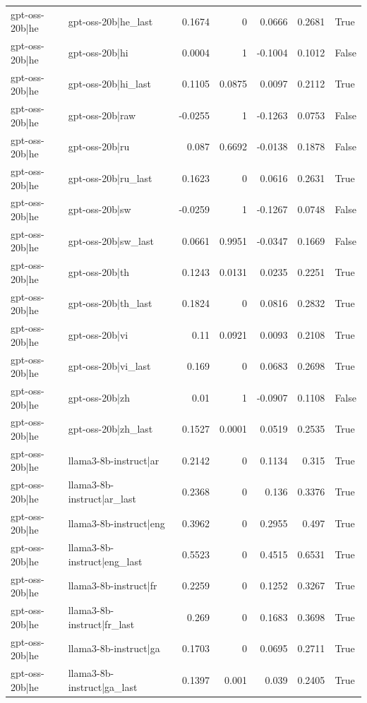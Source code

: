 \begin{table}
\begin{tabular}{l l r r r r l}
gpt-oss-20b|he & gpt-oss-20b|he_last & 0.1674 & 0 & 0.0666 & 0.2681 & True \\
gpt-oss-20b|he & gpt-oss-20b|hi & 0.0004 & 1 & -0.1004 & 0.1012 & False \\
gpt-oss-20b|he & gpt-oss-20b|hi_last & 0.1105 & 0.0875 & 0.0097 & 0.2112 & True \\
gpt-oss-20b|he & gpt-oss-20b|raw & -0.0255 & 1 & -0.1263 & 0.0753 & False \\
gpt-oss-20b|he & gpt-oss-20b|ru & 0.087 & 0.6692 & -0.0138 & 0.1878 & False \\
gpt-oss-20b|he & gpt-oss-20b|ru_last & 0.1623 & 0 & 0.0616 & 0.2631 & True \\
gpt-oss-20b|he & gpt-oss-20b|sw & -0.0259 & 1 & -0.1267 & 0.0748 & False \\
gpt-oss-20b|he & gpt-oss-20b|sw_last & 0.0661 & 0.9951 & -0.0347 & 0.1669 & False \\
gpt-oss-20b|he & gpt-oss-20b|th & 0.1243 & 0.0131 & 0.0235 & 0.2251 & True \\
gpt-oss-20b|he & gpt-oss-20b|th_last & 0.1824 & 0 & 0.0816 & 0.2832 & True \\
gpt-oss-20b|he & gpt-oss-20b|vi & 0.11 & 0.0921 & 0.0093 & 0.2108 & True \\
gpt-oss-20b|he & gpt-oss-20b|vi_last & 0.169 & 0 & 0.0683 & 0.2698 & True \\
gpt-oss-20b|he & gpt-oss-20b|zh & 0.01 & 1 & -0.0907 & 0.1108 & False \\
gpt-oss-20b|he & gpt-oss-20b|zh_last & 0.1527 & 0.0001 & 0.0519 & 0.2535 & True \\
gpt-oss-20b|he & llama3-8b-instruct|ar & 0.2142 & 0 & 0.1134 & 0.315 & True \\
gpt-oss-20b|he & llama3-8b-instruct|ar_last & 0.2368 & 0 & 0.136 & 0.3376 & True \\
gpt-oss-20b|he & llama3-8b-instruct|eng & 0.3962 & 0 & 0.2955 & 0.497 & True \\
gpt-oss-20b|he & llama3-8b-instruct|eng_last & 0.5523 & 0 & 0.4515 & 0.6531 & True \\
gpt-oss-20b|he & llama3-8b-instruct|fr & 0.2259 & 0 & 0.1252 & 0.3267 & True \\
gpt-oss-20b|he & llama3-8b-instruct|fr_last & 0.269 & 0 & 0.1683 & 0.3698 & True \\
gpt-oss-20b|he & llama3-8b-instruct|ga & 0.1703 & 0 & 0.0695 & 0.2711 & True \\
gpt-oss-20b|he & llama3-8b-instruct|ga_last & 0.1397 & 0.001 & 0.039 & 0.2405 & True \\

\end{tabular}
\end{table}
